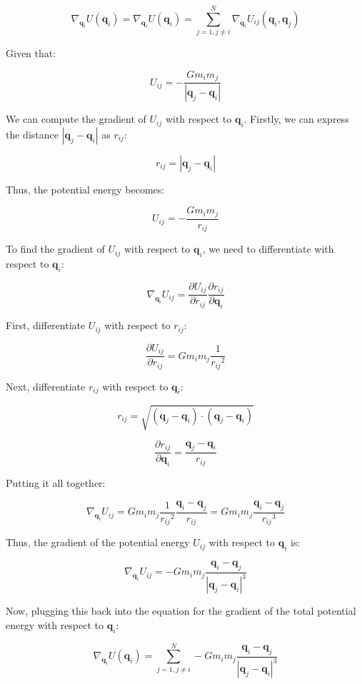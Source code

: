 \documentclass{article}
\begin{document}
\[
	\nabla_{\mathbf{q}_i} U(\mathbf{q}_i) = 
		\nabla_{\mathbf{q}_i} U(\mathbf{q}_i) = \sum_{j=1, j\neq i}^{N} \nabla_{\mathbf{q}_i} U_{ij}(\mathbf{q}_i, \mathbf{q}_j)
\]
		
Given that:
		
\[
	U_{ij} = -\frac{G m_i m_j}{|\mathbf{q}_j - \mathbf{q}_i|}
\]
		
We can compute the gradient of \(U_{ij}\) with respect to \(\mathbf{q}_i\). Firstly, we can express the distance \(|\mathbf{q}_j - \mathbf{q}_i|\) as \(r_{ij}\):

\[ 
	r_{ij} = |\mathbf{q}_j - \mathbf{q}_i| 
\]

Thus, the potential energy becomes:

\[ 
	U_{ij} = -\frac{G m_i m_j}{r_{ij}} 
\]

To find the gradient of \(U_{ij}\) with respect to \(\mathbf{q}_i\), we need to differentiate with respect to \(\mathbf{q}_i\):

\[ 
	\nabla_{\mathbf{q}_i} U_{ij} = \frac{\partial U_{ij}}{\partial r_{ij}} \frac{\partial r_{ij}}{\partial \mathbf{q}_i} 
\]

First, differentiate \(U_{ij}\) with respect to \(r_{ij}\):

\[ 
	\frac{\partial U_{ij}}{\partial r_{ij}} = G m_i m_j \frac{1}{{r_{ij}}^2} 
\]

Next, differentiate \(r_{ij}\) with respect to \(\mathbf{q}_i\):

\[ 
	r_{ij} = \sqrt{(\mathbf{q}_j - \mathbf{q}_i) \cdot (\mathbf{q}_j - \mathbf{q}_i)} 
\]

\[ 
	\frac{\partial r_{ij}}{\partial \mathbf{q}_i} = \frac{\mathbf{q}_j - \mathbf{q}_i}{{r_{ij}}} 
\]

Putting it all together:

\[ 
	\nabla_{\mathbf{q}_i} U_{ij} = G m_i m_j \frac{1}{{r_{ij}}^2} \frac{\mathbf{q}_i - \mathbf{q}_j}{{r_{ij}}} = G m_i m_j \frac{\mathbf{q}_i - \mathbf{q}_j}{{r_{ij}}^3} 
\]

Thus, the gradient of the potential energy \(U_{ij}\) with respect to \(\mathbf{q}_i\) is:
		
\[
	\nabla_{\mathbf{q}_i} U_{ij} = - G m_i m_j \frac{\mathbf{q}_i - \mathbf{q}_j}{|\mathbf{q}_j - \mathbf{q}_i|^3}
\]
		
Now, plugging this back into the equation for the gradient of the total potential energy with respect to \(\mathbf{q}_i\):
		
\[
	\nabla_{\mathbf{q}_i} U(\mathbf{q}_i) = \sum_{j=1, j\neq i}^{N} - G m_i m_j \frac{\mathbf{q}_i - \mathbf{q}_j}{|\mathbf{q}_j - \mathbf{q}_i|^3}
\]
		
\end{document}
